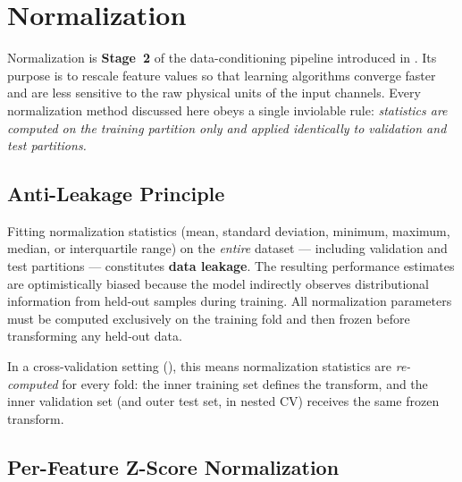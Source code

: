 
\section{Normalization}
\label{sec:norm}

Normalization is \textbf{Stage~2} of the data-conditioning pipeline
introduced in .  Its purpose is to rescale feature
values so that learning algorithms converge faster and are less
sensitive to the raw physical units of the input channels.  Every
normalization method discussed here obeys a single inviolable rule:
\emph{statistics are computed on the training partition only and applied
identically to validation and test partitions.}

\subsection{Anti-Leakage Principle}
\label{sec:norm:leakage}

\begin{tcolorbox}[
  colback=red!5!white,
  colframe=red!75!black,
  title={\textbf{Warning — Data-Leakage Risk}},
  fonttitle=\bfseries
]
Fitting normalization statistics (mean, standard deviation, minimum,
maximum, median, or interquartile range) on the \emph{entire} dataset —
including validation and test partitions — constitutes \textbf{data
leakage}.  The resulting performance estimates are optimistically biased
because the model indirectly observes distributional information from
held-out samples during training.  All normalization parameters must be
computed exclusively on the training fold and then frozen before
transforming any held-out data.
\end{tcolorbox}

In a cross-validation setting (), this means
normalization statistics are \emph{re-computed} for every fold: the
inner training set defines the transform, and the inner validation set
(and outer test set, in nested CV) receives the same frozen transform.

\subsection{Per-Feature Z-Score Normalization}
\label{sec:norm:zscore}

